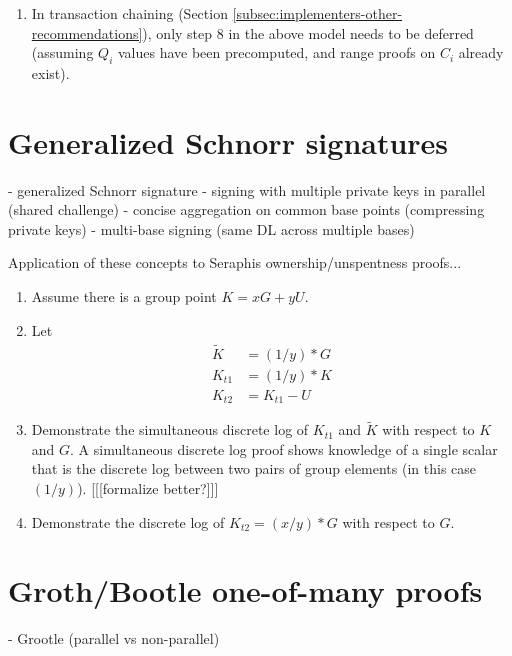 \begin{appendices}
\begin{enumerate}
    \item In transaction chaining (Section \ref{subsec:implementers-other-recommendations}), only step 8 in the above model needs to be deferred (assuming $Q_i$ values have been precomputed, and range proofs on $C_i$ already exist).
\end{enumerate}



\section{Generalized Schnorr signatures}
\label{appendix:generalized-schnorr-signatures}

- generalized Schnorr signature
    - signing with multiple private keys in parallel (shared challenge)
    - concise aggregation on common base points (compressing private keys)
    - multi-base signing (same DL across multiple bases)

Application of these concepts to Seraphis ownership/unspentness proofs...

\begin{enumerate}
    \item Assume there is a group point $K = x G + y U$.

    \item Let\vspace{.115cm}
    \begin{align*}
        \tilde{K} &= (1/y)*G \\
        K_{t1} &= (1/y)*K \\
        K_{t2} &= K_{t1} - U
    \end{align*}

    \item Demonstrate the simultaneous discrete log of $K_{t1}$ and $\tilde{K}$ with respect to $K$ and $G$. A simultaneous discrete log proof shows knowledge of a single scalar that is the discrete log between two pairs of group elements (in this case $(1/y)$). [[[formalize better?]]]

    \item Demonstrate the discrete log of $K_{t2} = (x/y)*G$ with respect to $G$.
\end{enumerate}



\section{Groth/Bootle one-of-many proofs}
\label{appendix:grootle-one-of-many-proofs}

- Grootle (parallel vs non-parallel)

\end{appendices}